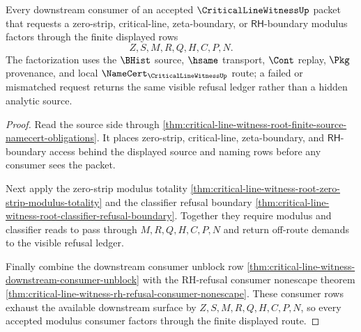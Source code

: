 \begin{theorem}
\label{thm:critical-line-witness-root-visible-modulus-consumer-totality}
Every downstream consumer of an accepted $\CriticalLineWitnessUp$ packet that
requests a zero-strip, critical-line, zeta-boundary, or $\mathsf{RH}$-boundary
modulus factors through the finite displayed rows
$$
Z,S,M,R,Q,H,C,P,N .
$$
The factorization uses the $\BHist$ source, $\hsame$ transport, $\Cont$ replay,
$\Pkg$ provenance, and local $\NameCert_{\CriticalLineWitnessUp}$ route; a
failed or mismatched request returns the same visible refusal ledger rather
than a hidden analytic source.
\end{theorem}
\begin{proof}
Read the source side through
\autoref{thm:critical-line-witness-root-finite-source-namecert-obligations}.
It places zero-strip, critical-line, zeta-boundary, and $\mathsf{RH}$-boundary
access behind the displayed source and naming rows before any consumer sees
the packet.

Next apply the zero-strip modulus totality
\autoref{thm:critical-line-witness-root-zero-strip-modulus-totality} and the
classifier refusal boundary
\autoref{thm:critical-line-witness-root-classifier-refusal-boundary}. Together
they require modulus and classifier reads to pass through
$M,R,Q,H,C,P,N$ and return off-route demands to the visible refusal ledger.

Finally combine the downstream consumer unblock row
\autoref{thm:critical-line-witness-downstream-consumer-unblock} with the
RH-refusal consumer nonescape theorem
\autoref{thm:critical-line-witness-rh-refusal-consumer-nonescape}. These
consumer rows exhaust the available downstream surface by
$Z,S,M,R,Q,H,C,P,N$, so every accepted modulus consumer factors through the
finite displayed route.
\end{proof}
